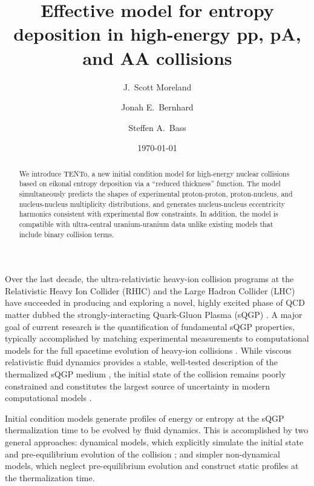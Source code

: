 \documentclass[aps,prc,reprint,amsmath]{revtex4-1}
\newcommand{\psec}[1]{\phantomsection\addcontentsline{toc}{section}{#1}}
\newcommand{\trento}{T\raisebox{-.5ex}{R}ENTo}
\begin{document}
\title{Effective model for entropy deposition in high-energy pp, pA, and AA collisions}

\author{J.\ Scott Moreland}
\author{Jonah E.\ Bernhard}
\author{Steffen A.\ Bass}

\date{\today}


\begin{abstract}
  We introduce \trento, a new initial condition model for high-energy nuclear collisions based on eikonal entropy deposition via a ``reduced thickness'' function.
  The model simultaneously predicts the shapes of experimental proton-proton, proton-nucleus, and nucleus-nucleus multiplicity distributions, and generates nucleus-nucleus eccentricity harmonics consistent with experimental flow constraints.
  In addition, the model is compatible with ultra-central uranium-uranium data unlike existing models that include binary collision terms.
\end{abstract}


\maketitle

\psec{Introduction}

Over the last decade, the ultra-relativistic heavy-ion collision programs at the Relativistic Heavy Ion Collider (RHIC) and the Large Hadron Collider (LHC) have succeeded in producing and exploring a novel, highly excited phase of QCD matter dubbed the strongly-interacting Quark-Gluon Plasma (sQGP)
\cite{Arsene:2004fa,Adcox:2004mh,Back:2004je,Adams:2005dq,Gyulassy:2004zy,Muller:2006ee,Muller:2012zq}.
A major goal of current research is the quantification of fundamental sQGP properties, typically accomplished by matching experimental measurements to computational models for the full spacetime evolution of heavy-ion collisions \cite{Petersen:2010zt,Novak:2013bqa}.
While viscous relativistic fluid dynamics provides a stable, well-tested description of the thermalized sQGP medium \cite{Baier:2006gy,Song:2007ux,Luzum:2008cw,Schenke:2010rr,Shen:2011eg,Shen:2014vra}, the initial state of the collision remains poorly constrained and constitutes the largest source of uncertainty in modern computational models \cite{Song:2010mg, Retinskaya:2013gca}.

Initial condition models generate profiles of energy or entropy at the sQGP thermalization time to be evolved by fluid dynamics.
This is accomplished by two general approaches:
dynamical models, which explicitly simulate the initial state and pre-equilibrium evolution of the collision \cite{Schenke:2012wb,vanderSchee:2013pia,Berges:2014yta,Kurkela:2014tea};
and simpler non-dynamical models, which neglect pre-equilibrium evolution and construct static profiles at the thermalization time.
\end{document}
